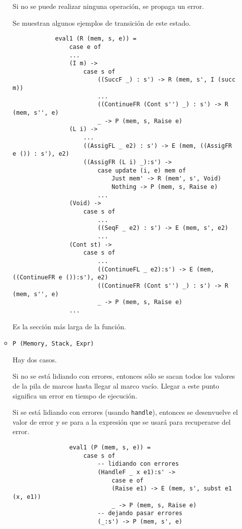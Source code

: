 \documentclass{article}
\newcommand{\tx}[1]{\texttt{#1}}
\begin{document}
\begin{itemize}
\begin{itemize}
            Si no se puede realizar ninguna operación, se propaga un error.

            Se muestran algunos ejemplos de transición de este estado.

            \begin{verbatim}
            eval1 (R (mem, s, e)) =
                case e of
                ...
                (I m) ->
                    case s of
                        ((SuccF _) : s') -> R (mem, s', I (succ m))
                        ...
                        ((ContinueFR (Cont s'') _) : s') -> R (mem, s'', e)
                        _ -> P (mem, s, Raise e)
                (L i) ->
                    ...
                    ((AssigFL _ e2) : s') -> E (mem, ((AssigFR e ()) : s'), e2)
                    ((AssigFR (L i) _):s') -> 
                        case update (i, e) mem of
                            Just mem' -> R (mem', s', Void)
                            Nothing -> P (mem, s, Raise e)
                        ...
                (Void) ->
                    case s of 
                        ...
                        ((SeqF _ e2) : s') -> E (mem, s', e2)
                        ...
                (Cont st) ->
                    case s of
                        ...
                        ((ContinueFL _ e2):s') -> E (mem, ((ContinueFR e ()):s'), e2)
                        ((ContinueFR (Cont s'') _) : s') -> R (mem, s'', e)
                        _ -> P (mem, s, Raise e)
                ...
            \end{verbatim}

            Es la sección más larga de la función.

            \item \tx{P (Memory, Stack, Expr)}

            Hay dos casos. 
            
            Si no se está lidiando con errores, entonces sólo se
            sacan todos los valores de la pila de marcos hasta llegar al marco
            vacío. Llegar a este punto significa un error en tiempo de 
            ejecución.

            Si se está lidiando con errores (usando \tx{handle}), entonces se 
            desenvuelve el valor de error y se para a la expresión que se usará
            para recuperarse del error.

            \begin{verbatim}
                eval1 (P (mem, s, e)) =
                    case s of
                        -- lidiando con errores
                        (HandleF _ x e1):s' ->
                            case e of 
                            (Raise e1) -> E (mem, s', subst e1 (x, e1))
                            _ -> P (mem, s, Raise e)
                        -- dejando pasar errores
                        (_:s') -> P (mem, s', e)
            \end{verbatim}


\end{itemize}
\end{itemize}
\end{document}
